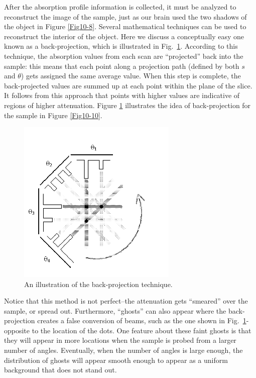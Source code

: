After the absorption profile information is collected, it must be analyzed to reconstruct the image of the sample, just as our brain used the two shadows of the object in Figure \ref{Fig10-8}.  Several mathematical techniques can be used to reconstruct the interior of the object. Here we discuss a conceptually easy one known as a back-projection, which is illustrated in Fig.~\ref{Fig10-11}.  According to this technique, the absorption values from each scan are ``projected'' back into the sample: this means that each point along a projection path (defined by both $s$ and $\theta$) gets assigned the same average value.  When this step is complete, the back-projected values are summed up at each point within the plane of the slice.  It follows from this approach that points with higher values are indicative of regions of higher attenuation. Figure \ref{Fig10-11} illustrates the idea of back-projection for the sample in Figure \ref{Fig10-10}.  
\begin{figure}[!htb]
	\centering
	\includegraphics[width=3.0in]{./figures/Topic10/Fig10-11.png}
	\caption{An illustration of the back-projection technique.}
	\label{Fig10-11}
\end{figure}
Notice that this method is not perfect--the attenuation gets ``smeared'' over the sample, or spread out.  Furthermore, ``ghosts'' can also appear where the back-projection creates a false conversion of beams, such as the one shown in Fig.~\ref{Fig10-11}- opposite to the location of the dots. One feature about these faint ghosts is that they will appear in more locations when the sample is probed from a larger number of angles. Eventually, when the number of angles is large enough, the distribution of ghosts will appear smooth enough to appear as a uniform background that does not stand out.

